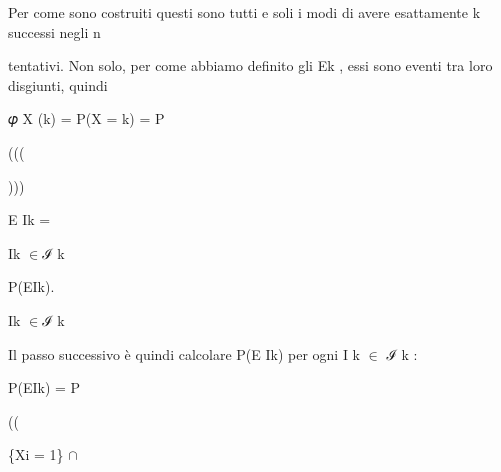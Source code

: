 \documentclass[a4paper,portrait,12pt]{article}
\begin{document}
\begin{flushleft}
Per come sono costruiti questi sono tutti e soli i modi di avere esattamente k successi negli n
\end{flushleft}


\begin{flushleft}
tentativi. Non solo, per come abbiamo definito gli Ek , essi sono eventi tra loro disgiunti, quindi
\end{flushleft}


\begin{flushleft}
𝜑 X (k) = P(X = k) = P
\end{flushleft}





(((





)))





\begin{flushleft}
E Ik =
\end{flushleft}





\begin{flushleft}
Ik $\in$ℐ k
\end{flushleft}





\begin{flushleft}
P(EIk).
\end{flushleft}


\begin{flushleft}
Ik $\in$ℐ k
\end{flushleft}





\begin{flushleft}
Il passo successivo \`{e} quindi calcolare P(E Ik) per ogni I k $\in$ ℐ k :
\end{flushleft}


\begin{flushleft}
P(EIk) = P
\end{flushleft}





((





\begin{flushleft}
\{Xi = 1\} $\cap$
\end{flushleft}
\end{document}
